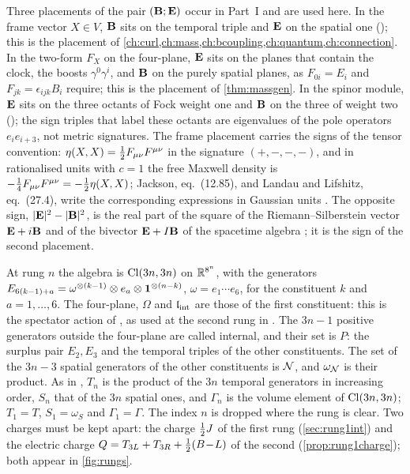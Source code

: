 Three placements of the pair $(\mathbf B;\mathbf E)$ occur in Part~I and are used here. In the frame vector $X\in V$, $\mathbf B$ sits on the temporal triple
and $\mathbf E$ on the spatial one (); this is the placement of \cref{ch:curl,ch:mass,ch:bcoupling,ch:quantum,ch:connection}. In the
two-form $F_X$ on the four-plane, $\mathbf E$ sits on the planes that contain the clock, the boosts $\gamma^0\gamma^i$, and $\mathbf B$ on the purely
spatial planes, as $F_{0i}=E_i$ and $F_{jk}=\epsilon_{ijk}B_i$ require; this is the placement of \cref{thm:massgen}. In the spinor module,
$\mathbf E$ sits on the three octants of Fock weight one and $\mathbf B$ on the three of weight two (); the sign triples
that label these octants are eigenvalues of the pole operators $e_ie_{i+3}$, not metric signatures. The frame placement carries the signs of
the tensor convention: $\eta(X,X)=\tfrac12 F_{\mu\nu}F^{\mu\nu}$ in the signature $(+,-,-,-)$, and in rationalised units with $c=1$ the free
Maxwell density is $-\tfrac14F_{\mu\nu}F^{\mu\nu}=-\tfrac12\eta(X,X)$; Jackson, eq.~(12.85), and Landau and Lifshitz, eq.~(27.4), write the
corresponding expressions in Gaussian units \cite{Jackson,LandauLifshitz2}. The opposite sign, $|\mathbf E|^2-|\mathbf B|^2$, is the real part of the square of the
Riemann--Silberstein vector $\mathbf E+i\mathbf B$ \cite{Silberstein1907,BialynickiBirula13} and of the bivector $\mathbf E+I\mathbf B$ of the spacetime algebra
\cite{Hestenes66}; it is the sign of the second placement.

At rung $n$ the algebra is $\mathrm{Cl}(3n,3n)$ on $\mathbb{R}^{8^n}$, with the generators
$E_{6(k-1)+a}=\omega^{\otimes(k-1)}\otimes e_a\otimes\mathbf 1^{\otimes(n-k)}$, $\omega=e_1\cdots e_6$, for the constituent $k$ and $a=1,\dots,6$.
The four-plane, $\Omega$ and $\mathfrak l_{\rm int}$ are those of the first constituent: this is the spectator action of , as used at the
second rung in . The $3n-1$ positive generators outside the four-plane are called internal, and their set is $P$: the
surplus pair $E_2,E_3$ and the temporal triples of the other constituents. The set of the $3n-3$ spatial generators of the other constituents
is $\mathcal N$, and $\omega_\mathcal N$ is their product. As in , $T_n$ is the product of the $3n$ temporal generators in increasing order,
$S_n$ that of the $3n$ spatial ones, and $\Gamma_n$ is the volume element of $\mathrm{Cl}(3n,3n)$; $T_1=T$, $S_1=\omega_S$ and $\Gamma_1=\Gamma$. The
index $n$ is dropped where the rung is clear. Two charges must be kept apart: the charge $\tfrac12 J$ of the first rung (\cref{sec:rung1int})
and the electric charge $Q=T_{3L}+T_{3R}+\tfrac12(B\!-\!L)$ of the second (\cref{prop:rung1charge}); both appear in \cref{fig:rungs}.

